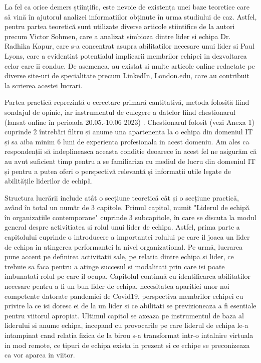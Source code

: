 \documentclass[a4paper, 12pt]{article}
\begin{document}
	\quad La fel ca orice demers științific, este nevoie de existența unei baze teoretice care să vină în ajutorul analizei informațiilor obținute în urma studiului de caz. Astfel, pentru partea teoretică sunt utilizate diverse articole stiintifice de la autori precum Victor Sohmen, care a analizat simbioza dintre lider si echipa Dr. Radhika Kapur, care s-a concentrat asupra abilitatilor necesare unui lider si Paul Lyons, care a evidentiat potentialul implicarii membrilor echipei in dezvoltarea celor care ii conduc. De asemenea, au existat si multe articole online redactate pe diverse site-uri de specialitate precum LinkedIn, London.edu, care au contribuit la scrierea acestei lucrari.

	\quad Partea practică reprezintă o cercetare primară cantitativă, metoda folosită fiind sondajul de opinie, iar instrumentul de culegere a datelor fiind chestionarul (lansat online în perioada 20.05.-10.06 2023) . Chestionarul folosit (vezi Anexa 1) cuprinde 2 întrebări filtru și anume una apartenenta la o echipa din domeniul IT și sa aiba minim 6 luni de experienta profesionala in acest domeniu. Am ales ca respondenții să indeplineasca aceasta conditie deoarece în acest fel ne asigurăm că au avut suficient timp pentru a se familiariza cu mediul de lucru din domeniul IT și pentru a putea oferi o perspectivă relevantă și informații utile legate de abilitățile liderilor de echipă.

	\quad Structura lucrării include atât o secțiune teoretică cât și o secțiune practică, având în total un număr de 3 capitole. Primul capitol, numit "Liderul de echipă în organizațiile contemporane" cuprinde 3 subcapitole, în care se discuta la modul general despre activitiatea si rolul unui lider de echipa. Astfel, prima parte a capitolului cuprinde o introducere a importantei rolului pe care il joaca un lider de echipa in atingerea performantei la nivel organizational. Pe urmă, lucrarea pune accent pe definirea activitatii sale, pe relatia dintre echipa si lider, ce trebuie sa faca pentru a atinge succesul si modalitati prin care isi poate imbunatati rolul pe care il ocupa. Capitolul continuă cu identificarea abilitatilor necesare pentru a fi un bun lider de echipa, necesitatea aparitiei unor noi competente datorate pandemiei de Covid19, perspectiva membrilor echipei cu privire la ce isi doresc ei de la un lider si ce abilitati se previzioneaza a fi esentiale pentru viitorul apropiat. Ultimul capitol se axeaza pe instrumentul de baza al liderului si anume echipa, incepand cu provocarile pe care liderul de echipa le-a intampinat cand relatia fizica de la birou s-a transformat intr-o intalnire virtuala in mod remote, ce tipuri de echipa exista in prezent si ce echipe se preconizeaza ca vor aparea in viitor.
\end{document}

